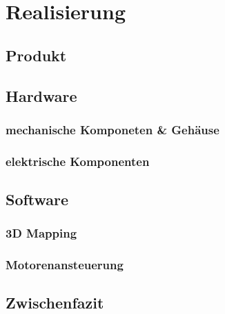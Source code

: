 \chapter{Realisierung}
\label{chap:Realisierung}

\section{Produkt}
\label{sec:Produkt}
\Blindtext[2][3] 
\blinditemize

\section {Hardware}
\label{sec:Hardware}

\subsection {mechanische Komponeten \& Gehäuse}
\label{sec:mechKomp}

\subsection {elektrische Komponenten}
\label{sec:elekKomp}

\section{Software}
\label{sec:Software}

\subsection {3D Mapping}
\label{sec:3DMapping}


\subsection {Motorenansteuerung}
\label{sec:Motorenansteuerung}

\section{Zwischenfazit}
\label{sec:ZwischenfazitReal}